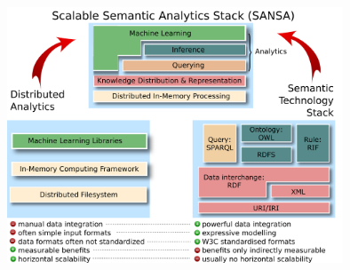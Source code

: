 \begin{center}
    \includegraphics[width=10cm]{gfx/chapters/preliminaries/sansa1.png}
\end{center}



